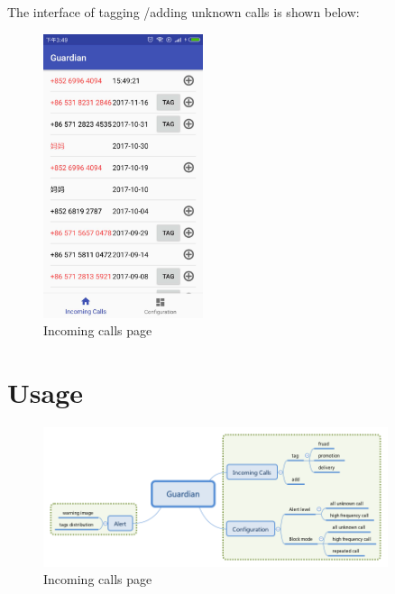 \documentclass{article}
\begin{document}
    The interface of tagging /adding unknown calls is shown below:
    \begin{figure}[H]
        \centering
        \includegraphics[width=0.418\textwidth]{images/calls.jpg}
        \caption{Incoming calls page}
        \label{image_calls}
    \end{figure}

    \section{Usage}
    \begin{figure}[H]
        \centering
        \includegraphics[width=0.9\textwidth]{images/guide.png}
        \caption{Incoming calls page}
        \label{image_guide}
    \end{figure}
\end{document}
